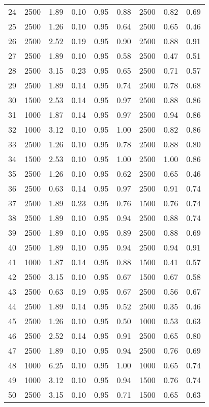 \begin{longtable}[c]{ccccccccc}
24 &  2500 &  1.89 &  0.10 &  0.95 &  0.88 &  2500 &  0.82 &  0.69 \\
25 &  2500 &  1.26 &  0.10 &  0.95 &  0.64 &  2500 &  0.65 &  0.46 \\
26 &  2500 &  2.52 &  0.19 &  0.95 &  0.90 &  2500 &  0.88 &  0.91 \\
27 &  2500 &  1.89 &  0.10 &  0.95 &  0.58 &  2500 &  0.47 &  0.51 \\
28 &  2500 &  3.15 &  0.23 &  0.95 &  0.65 &  2500 &  0.71 &  0.57 \\
29 &  2500 &  1.89 &  0.14 &  0.95 &  0.74 &  2500 &  0.78 &  0.68 \\
30 &  1500 &  2.53 &  0.14 &  0.95 &  0.97 &  2500 &  0.88 &  0.86 \\
31 &  1000 &  1.87 &  0.14 &  0.95 &  0.97 &  2500 &  0.94 &  0.86 \\
32 &  1000 &  3.12 &  0.10 &  0.95 &  1.00 &  2500 &  0.82 &  0.86 \\
33 &  2500 &  1.26 &  0.10 &  0.95 &  0.78 &  2500 &  0.88 &  0.80 \\
34 &  1500 &  2.53 &  0.10 &  0.95 &  1.00 &  2500 &  1.00 &  0.86 \\
35 &  2500 &  1.26 &  0.10 &  0.95 &  0.62 &  2500 &  0.65 &  0.46 \\
36 &  2500 &  0.63 &  0.14 &  0.95 &  0.97 &  2500 &  0.91 &  0.74 \\
37 &  2500 &  1.89 &  0.23 &  0.95 &  0.76 &  1500 &  0.76 &  0.74 \\
38 &  2500 &  1.89 &  0.10 &  0.95 &  0.94 &  2500 &  0.88 &  0.74 \\
39 &  2500 &  1.89 &  0.10 &  0.95 &  0.89 &  2500 &  0.88 &  0.69 \\
40 &  2500 &  1.89 &  0.10 &  0.95 &  0.94 &  2500 &  0.94 &  0.91 \\
41 &  1000 &  1.87 &  0.14 &  0.95 &  0.88 &  1500 &  0.41 &  0.57 \\
42 &  2500 &  3.15 &  0.10 &  0.95 &  0.67 &  1500 &  0.67 &  0.58 \\
43 &  2500 &  0.63 &  0.19 &  0.95 &  0.67 &  2500 &  0.56 &  0.67 \\
44 &  2500 &  1.89 &  0.14 &  0.95 &  0.52 &  2500 &  0.35 &  0.46 \\
45 &  2500 &  1.26 &  0.10 &  0.95 &  0.50 &  1000 &  0.53 &  0.63 \\
46 &  2500 &  2.52 &  0.14 &  0.95 &  0.91 &  2500 &  0.65 &  0.80 \\
47 &  2500 &  1.89 &  0.10 &  0.95 &  0.94 &  2500 &  0.76 &  0.69 \\
48 &  1000 &  6.25 &  0.10 &  0.95 &  1.00 &  1000 &  0.65 &  0.74 \\
49 &  1000 &  3.12 &  0.10 &  0.95 &  0.94 &  1500 &  0.76 &  0.74 \\
50 &  2500 &  3.15 &  0.10 &  0.95 &  0.71 &  1500 &  0.65 &  0.63 \\
\bottomrule
\end{longtable}


